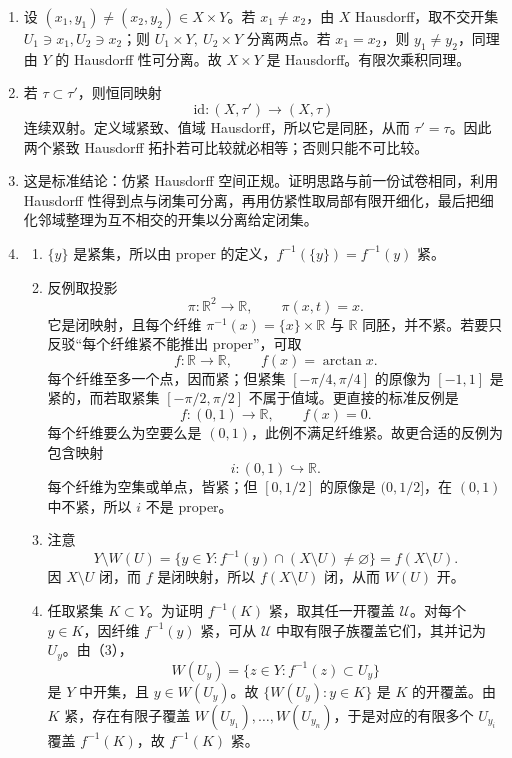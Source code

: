 \documentclass{article}
\newcommand{\R}{\mathbb{R}}
\begin{document}
\begin{enumerate}
  \item 设 $(x_1,y_1)\neq(x_2,y_2)\in X\times Y$。若 $x_1\neq x_2$，由 $X$ Hausdorff，取不交开集 $U_1\ni x_1,U_2\ni x_2$；则 $U_1\times Y,\ U_2\times Y$ 分离两点。若 $x_1=x_2$，则 $y_1\neq y_2$，同理由 $Y$ 的 Hausdorff 性可分离。故 $X\times Y$ 是 Hausdorff。有限次乘积同理。

  \item 若 $\tau\subset\tau'$，则恒同映射
        \[
          \mathrm{id}:(X,\tau')\to(X,\tau)
        \]
        连续双射。定义域紧致、值域 Hausdorff，所以它是同胚，从而 $\tau'=\tau$。因此两个紧致 Hausdorff 拓扑若可比较就必相等；否则只能不可比较。

  \item 这是标准结论：仿紧 Hausdorff 空间正规。证明思路与前一份试卷相同，利用 Hausdorff 性得到点与闭集可分离，再用仿紧性取局部有限开细化，最后把细化邻域整理为互不相交的开集以分离给定闭集。

  \item
        \begin{enumerate}
          \item $\{y\}$ 是紧集，所以由 proper 的定义，$f^{-1}(\{y\})=f^{-1}(y)$ 紧。

          \item 反例取投影
                \[
                  \pi:\R^2\to\R,\qquad \pi(x,t)=x.
                \]
                它是闭映射，且每个纤维 $\pi^{-1}(x)=\{x\}\times\R$ 与 $\R$ 同胚，并不紧。若要只反驳“每个纤维紧不能推出 proper”，可取
                \[
                  f:\R\to\R,\qquad f(x)=\arctan x.
                \]
                每个纤维至多一个点，因而紧；但紧集 $[-\pi/4,\pi/4]$ 的原像为 $[-1,1]$ 是紧的，而若取紧集 $[-\pi/2,\pi/2]$ 不属于值域。更直接的标准反例是
                \[
                  f:(0,1)\to\R,\qquad f(x)=0.
                \]
                每个纤维要么为空要么是 $(0,1)$，此例不满足纤维紧。故更合适的反例为包含映射
                \[
                  i:(0,1)\hookrightarrow \R.
                \]
                每个纤维为空集或单点，皆紧；但 $[0,1/2]$ 的原像是 $(0,1/2]$，在 $(0,1)$ 中不紧，所以 $i$ 不是 proper。

          \item 注意
                \[
                  Y\setminus W(U)=\{y\in Y:f^{-1}(y)\cap(X\setminus U)\neq\varnothing\}=f(X\setminus U).
                \]
                因 $X\setminus U$ 闭，而 $f$ 是闭映射，所以 $f(X\setminus U)$ 闭，从而 $W(U)$ 开。

          \item 任取紧集 $K\subset Y$。为证明 $f^{-1}(K)$ 紧，取其任一开覆盖 $\mathcal U$。对每个 $y\in K$，因纤维 $f^{-1}(y)$ 紧，可从 $\mathcal U$ 中取有限子族覆盖它们，其并记为 $U_y$。由（3），
                \[
                  W(U_y)=\{z\in Y:f^{-1}(z)\subset U_y\}
                \]
                是 $Y$ 中开集，且 $y\in W(U_y)$。故 $\{W(U_y):y\in K\}$ 是 $K$ 的开覆盖。由 $K$ 紧，存在有限子覆盖 $W(U_{y_1}),\dots,W(U_{y_n})$，于是对应的有限多个 $U_{y_i}$ 覆盖 $f^{-1}(K)$，故 $f^{-1}(K)$ 紧。


\end{enumerate}
\end{enumerate}
\end{document}
